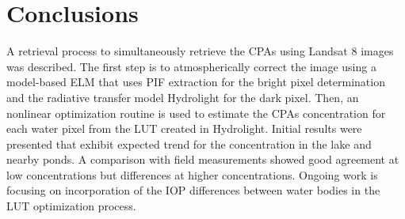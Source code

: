 \documentclass{article}
\begin{document}
\section{Conclusions}
\label{sec:conc}
A retrieval process to simultaneously retrieve the CPAs using Landsat 8 images was described. The first step is to atmospherically correct the image using a model-based ELM that uses PIF extraction for the bright pixel determination and the radiative transfer model Hydrolight for the dark pixel. Then, an nonlinear optimization routine is used to estimate the CPAs concentration for each water pixel from the LUT created in Hydrolight. Initial results were presented that exhibit expected trend for the concentration in the lake and nearby ponds. A comparison with field measurements showed good agreement at low concentrations but differences at higher concentrations. Ongoing work is focusing on incorporation of the IOP differences between water bodies in the LUT optimization process.


\end{document}
